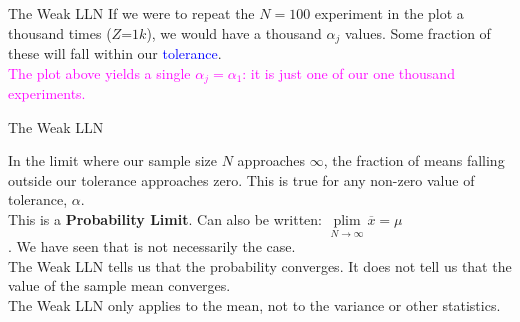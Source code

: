 \documentclass[10pt,sans,english,compress,xcolor=dvipsnames]{beamer}
\DeclareMathOperator*{\plim}{plim}
\begin{document}
\begin{frame}{The Weak LLN \hfill \small{}}
 {If we were to repeat the $N=100$ experiment in the plot a thousand times ($Z\mathord{=}1k$), we would have a thousand $\alpha_j$ values. Some fraction of these will fall within our \textcolor{blue}{tolerance}. \\
\textcolor{magenta}{The plot above yields a single $\alpha_j=\alpha_1$: it is just one of our one thousand experiments. }}
\end{frame}

\begin{frame}{The Weak LLN \hfill \small{}}
\footnotesize


In the limit where our sample size $N$ approaches $\infty$, the fraction of means falling outside our tolerance approaches zero. This is true for any non-zero value of tolerance, $\alpha$.\\[1ex]

This is a \textbf{Probability Limit}. Can also be written:  $\plim\limits_{N\to \infty}  \overline{x} =\mu$\\[1ex]

. We have seen that is not necessarily the case.\\[1ex]

The Weak LLN tells us that the probability converges. It does not tell us that the value of the sample mean converges.\\

The Weak LLN only applies to the mean, not to the variance or other statistics.\\[1ex]

\end{frame}
\end{document}
